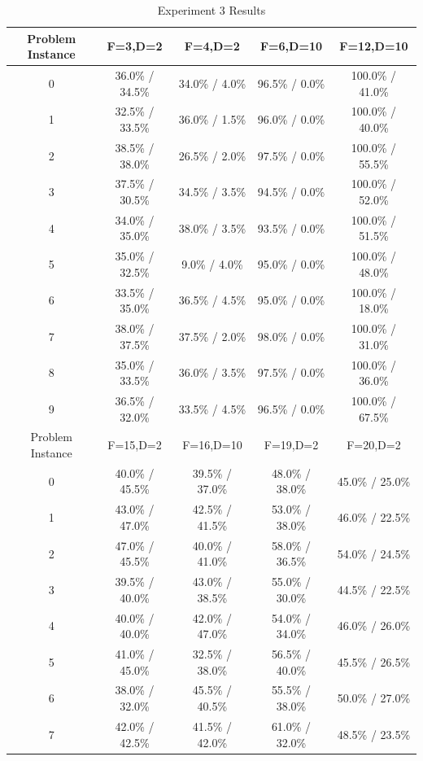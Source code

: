 \documentclass[sigconf]{acmart}
\begin{document}
\begin{table}
	\centering
	\caption{Experiment 3 Results}
	\label{tab:experiment3Results}
	\begin{tabular}{c|c|c|c|c}
		\toprule
		Problem Instance & F=3,D=2 & F=4,D=2 & F=6,D=10 & F=12,D=10\\
		\hline
		0 & 36.0\% / 34.5\% & 34.0\% / 4.0\% & 96.5\% / 0.0\% & 100.0\% / 41.0\%\\
		\hline
		1 & 32.5\% / 33.5\% & 36.0\% / 1.5\% & 96.0\% / 0.0\% & 100.0\% / 40.0\%\\
		\hline
		2 & 38.5\% / 38.0\% & 26.5\% / 2.0\% & 97.5\% / 0.0\% & 100.0\% / 55.5\%\\
		\hline
		3 & 37.5\% / 30.5\% & 34.5\% / 3.5\% & 94.5\% / 0.0\% & 100.0\% / 52.0\%\\
		\hline
		4 & 34.0\% / 35.0\% & 38.0\% / 3.5\% & 93.5\% / 0.0\% & 100.0\% / 51.5\%\\
		\hline
		5 & 35.0\% / 32.5\% & 9.0\% / 4.0\% & 95.0\% / 0.0\% & 100.0\% / 48.0\%\\
		\hline
		6 & 33.5\% / 35.0\% & 36.5\% / 4.5\% & 95.0\% / 0.0\% & 100.0\% / 18.0\%\\
		\hline
		7 & 38.0\% / 37.5\% & 37.5\% / 2.0\% & 98.0\% / 0.0\% & 100.0\% / 31.0\%\\
		\hline
		8 & 35.0\% / 33.5\% & 36.0\% / 3.5\% & 97.5\% / 0.0\% & 100.0\% / 36.0\%\\
		\hline
		9 & 36.5\% / 32.0\% & 33.5\% / 4.5\% & 96.5\% / 0.0\% & 100.0\% / 67.5\%\\
		\hline
		\hline
		Problem Instance & F=15,D=2 & F=16,D=10 & F=19,D=2 & F=20,D=2\\
		\hline
		0 & 40.0\% / 45.5\% & 39.5\% / 37.0\% & 48.0\% / 38.0\% & 45.0\% / 25.0\%\\
		\hline
		1 & 43.0\% / 47.0\% & 42.5\% / 41.5\% & 53.0\% / 38.0\% & 46.0\% / 22.5\%\\
		\hline
		2 & 47.0\% / 45.5\% & 40.0\% / 41.0\% & 58.0\% / 36.5\% & 54.0\% / 24.5\%\\
		\hline
		3 & 39.5\% / 40.0\% & 43.0\% / 38.5\% & 55.0\% / 30.0\% & 44.5\% / 22.5\%\\
		\hline
		4 & 40.0\% / 40.0\% & 42.0\% / 47.0\% & 54.0\% / 34.0\% & 46.0\% / 26.0\%\\
		\hline
		5 & 41.0\% / 45.0\% & 32.5\% / 38.0\% & 56.5\% / 40.0\% & 45.5\% / 26.5\%\\
		\hline
		6 & 38.0\% / 32.0\% & 45.5\% / 40.5\% & 55.5\% / 38.0\% & 50.0\% / 27.0\%\\
		\hline
		7 & 42.0\% / 42.5\% & 41.5\% / 42.0\% & 61.0\% / 32.0\% & 48.5\% / 23.5\%\\

\end{tabular}
\end{table}
\end{document}
